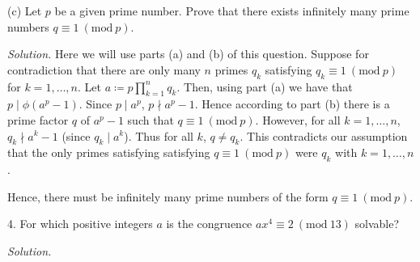 \documentclass{article}
\newcommand{\Mod}[1]{\ (\mathrm{mod}\ #1)}
\begin{document}
\vspace{5mm}

(c) Let $p$ be a given prime number. Prove that there exists infinitely
many prime numbers $q \equiv 1 \Mod{p}$.

\textit{Solution.}
Here we will use parts (a) and (b) of this question. Suppose for contradiction
that there are only many $n$ primes $q_k$ satisfying $q_k \equiv 1 \Mod{p}$
for $k = 1, \ldots, n$. Let $a \coloneqq p \prod_{k = 1}^n q_k$. Then, using part (a)
we have that $p \mid \phi(a^p - 1)$. Since $p \mid a^p$, $p \nmid a^p - 1$.
Hence according to part (b) there is a prime factor $q$ of $a^p - 1$
such that $q \equiv 1 \Mod{p}$. However, for all $k = 1, \ldots, n$, $q_k \nmid a^k - 1$
(since $q_k \mid a^k$). Thus for all $k$, $q \neq q_k$. This contradicts our assumption
that the only primes satisfying satisfying $q \equiv 1 \Mod{p}$
were $q_k$ with $k = 1, \ldots, n$.

Hence, there must be infinitely many prime numbers of the form $q \equiv 1 \Mod{p}$.
\newpage

4. For which positive integers $a$ is the congruence
$a x^4 \equiv 2 \Mod{13}$ solvable?

\textit{Solution.}
\end{document}
